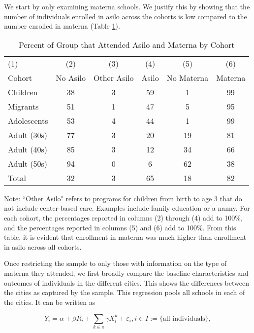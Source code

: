 \documentclass{article}
\begin{document}
We start by only examining materna schools. We justify this by showing that the number of individuals enrolled in asilo across the cohorts is low compared to the number enrolled in materna (Table \ref{asilo-materna}). 


\begin{table}[htbp]\centering
\caption{Percent of Group that Attended Asilo and Materna by Cohort} \label{asilo-materna}
\begin{center}
\begin{tabular} {l c c c c c} \\ 
\toprule
			 (1) & (2) & (3) & (4) & (5) & (6) \\
Cohort 		&  No Asilo & Other Asilo & Asilo & No Materna & Materna  \\
\midrule
Children		&    38	&        3&       59&    1&       99 \\
Migrants		&    51	&        1&       47&     5&       95 \\
Adolescents	&    53	&        4&       44&    1&       99 \\
Adult (30s)	&	   77 &        3&       20&    19&       81 \\
Adult (40s)	&     85	&        3&       12&   34&       66 \\
Adult (50s)	&     94	&	  0&      6&   62&       38 \\
\midrule
Total			&        32	&        3&       65&   18&       82 \\
\bottomrule
\end{tabular}
\end{center}
\raggedright
\footnotesize
Note: ``Other Asilo" refers to programs for children from birth to age 3 that do not include center-based care. Examples include family education or a nanny. For each cohort, the percentages reported in columns (2) through (4) add to 100\%, and the percentages reported in columns (5) and (6) add to 100\%. From this table, it is evident that enrollment in materna was much higher than enrollment in asilo across all cohorts.
\end{table}


Once restricting the sample to only those with information on the type of materna they attended, we first broadly compare the baseline characteristics and outcomes of individuals in the different cities. This shows the differences between the cities as captured by the sample. This regression pools all schools in each of the cities. It can be written as

\begin{equation} \label{pooling-schools}
	Y_{i} = \alpha + \beta R_{i} + \sum_{k \in \kappa} \gamma {X}_{i}^k  + \varepsilon_{i}, i \in I := \{ \text{all individuals}\},
\end{equation}
\end{document}
